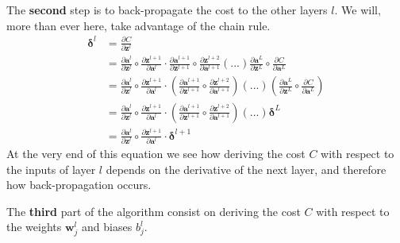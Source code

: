 			The \textbf{second} step is to back-propagate the cost to the other layers $l$. We will, more than ever here, take advantage of the chain rule.
			\begin{equation}
				\begin{split}
					\boldsymbol{\delta}^l
					&= \frac{\partial C}{\partial \boldsymbol{z}^l } \\
					&=	\frac{\partial \boldsymbol{a}^l }{\partial \boldsymbol{z}^l }  					\circ\frac{\partial \boldsymbol{z}^{l+1} }{\partial \boldsymbol{a}^l } \cdot
					\frac{\partial \boldsymbol{a}^{l+1} }{\partial \boldsymbol{z}^{l+1} }  				\circ\frac{\partial \boldsymbol{z}^{l+2}}{\partial \boldsymbol{a}^{l+1} }  (...)
					\frac{\partial \boldsymbol{a}^L }{\partial \boldsymbol{z}^L } 		 				\circ\frac{\partial C}{\partial \boldsymbol{a}^L } \\
					&=  \frac{\partial \boldsymbol{a}^l }{\partial \boldsymbol{z}^l }  					\circ\frac{\partial \boldsymbol{z}^{l+1} }{\partial \boldsymbol{a}^l }  \cdot
						\left( \frac{\partial \boldsymbol{a}^{l+1} }{\partial \boldsymbol{z}^{l+1} }  	\circ\frac{\partial \boldsymbol{z}^{l+2}}{\partial \boldsymbol{a}^{l+1} }\right) (...)
						\left( \frac{\partial \boldsymbol{a}^L }{\partial \boldsymbol{z}^L }			\circ\frac{\partial C}{\partial \boldsymbol{a}^L }\right) \\
					&= 	\frac{\partial \boldsymbol{a}^l }{\partial \boldsymbol{z}^l }   				\circ\frac{\partial \boldsymbol{z}^{l+1} }{\partial \boldsymbol{a}^l } \cdot
						\left( \frac{\partial \boldsymbol{a}^{l+1} }{\partial \boldsymbol{z}^{l+1} }  	\circ\frac{\partial \boldsymbol{z}^{l+2}}{\partial \boldsymbol{a}^{l+1} }\right) (...) 
						\boldsymbol{\delta}^{L}\\
					&= 	\frac{\partial \boldsymbol{a}^l }{\partial \boldsymbol{z}^l }  					\circ\frac{\partial \boldsymbol{z}^{l+1} }{\partial \boldsymbol{a}^l } \cdot
						\boldsymbol{\delta}^{l+1}
				\end{split}
			\end{equation}
			At the very end of this equation we see how deriving the cost $C$ with respect to the inputs of layer $l$ depends on the derivative of the next layer, and therefore how back-propagation occurs.

			The \textbf{third} part of the algorithm consist on deriving the cost $C$ with respect to the weights $\boldsymbol{w}^l_j$ and biases $b^l_j$.

